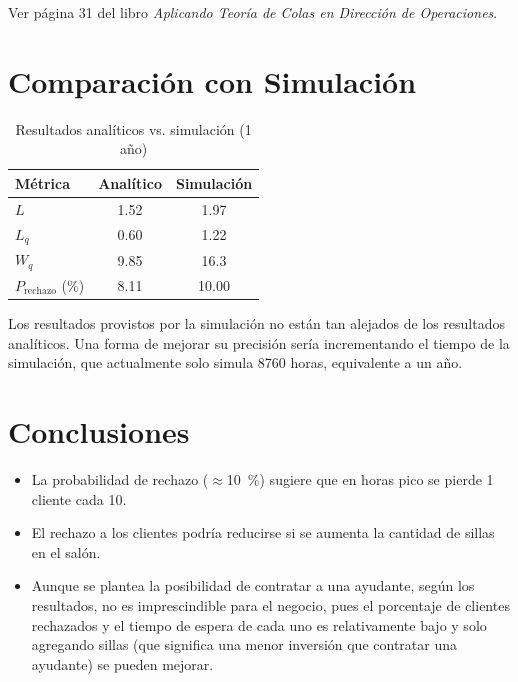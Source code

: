 \documentclass{article}
\begin{document}
Ver página 31 del libro \textit{Aplicando Teoría de Colas en Dirección de Operaciones}.

\section{Comparación con Simulación}
\begin{table}[H]
    \centering
    \caption{Resultados analíticos vs. simulación (1 año)}
    \begin{tabular}{lSS}
        \toprule
        Métrica & {Analítico} & {Simulación} \\
        \midrule
        $L$ & 1.52 & 1.97 \\
        $L_q$ & 0.60 & 1.22 \\
        $W_q$ & 9.85 & 16.3 \\
        $P_{\text{rechazo}}$ (\%) & 8.11 & 10.00 \\
        \bottomrule
    \end{tabular}
\end{table}

Los resultados provistos por la simulación no están tan alejados de los resultados analíticos. Una forma de 
mejorar su precisión sería incrementando el tiempo de la simulación, que actualmente solo simula 8760 horas, 
equivalente a un año.

\section{Conclusiones}
\begin{itemize}
    \item La probabilidad de rechazo ($\approx$\SI{10}{\%}) sugiere que en horas pico se pierde 1 cliente cada 10.
    \item El rechazo a los clientes podría reducirse si se aumenta la cantidad de sillas en el salón.
    \item Aunque se plantea la posibilidad de contratar a una ayudante, según los resultados, no es imprescindible para el
    negocio, pues el porcentaje de clientes rechazados y el tiempo de espera de cada uno es relativamente bajo y solo agregando sillas 
    (que significa una menor inversión que contratar una ayudante) se pueden mejorar.
\end{itemize}
\end{document}
